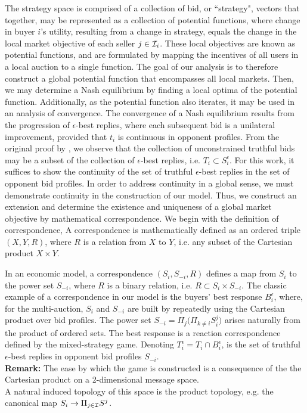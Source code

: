 The strategy space is comprised of a collection of bid, or ``strategy", vectors that
together, may be represented as a collection of potential functions, where change in buyer $i$'s
utility, resulting from a change in strategy, equals the change in
the local market objective of each seller $j\in\mathcal{I}_i$. These local objectives are known as potential functions, and are formulated by mapping the incentives of all users in a local auction to a single function. The goal of our analysis is to therefore construct a global potential function that encompasses all local markets. Then, we may determine a Nash equilibrium by finding a local optima of the potential function. Additionally, as the potential function also iterates, it may be used in an analysis of convergence. The
convergence of a Nash equilibrium results from the progression of
$\epsilon$-best replies, where each subsequent bid is a unilateral
improvement, provided that $t_i$ is continuous in opponent profiles.
From the original proof by \cite{lazar}, we observe that the collection of
unconstrained truthful bids may be a subset of the collection of $\epsilon$-best replies, i.e. $T_i\subset S_i^\epsilon$.         
For this work, it suffices to show the continuity of the set of truthful
$\epsilon$-best replies in the set of opponent bid profiles.
In order to address continuity in a global sense, we must demonstrate
continuity in the construction of our model.
Thus, we construct an extension %
and determine the existence and uniqueness of a global market objective by mathematical correspondence. We begin with the definition of correspondence,
{
A correspondence is mathematically defined as an ordered triple $(X,Y,R)$, where $R$ is a relation from $X$ to
$Y$, i.e. any subset of the Cartesian product $X\times Y$.
}

In an economic model, a correspondence $(S_i,S_{-i},R)$ defines a map from $S_i$
to the power set $S_{-i}$, where $R$ is a binary relation, i.e. $R \subset
S_i\times S_{-i}$. The classic
example of a correspondence in our model is the buyers' best response
$B_i^\epsilon$, where, for the multi-auction,
$S_i$ and $S_{-i}$ are built by repeatedly using the
Cartesian product over bid profiles. The power set 
$S_{-i} =\Pi_j \big(\Pi_{k\ne i} S_i^j)$ arises naturally from the
product of ordered sets. 
The best response is a reaction correspondence
defined by the mixed-strategy game. Denoting  $T_i^\epsilon = T_i\cap
B_i^\epsilon$, is the set of truthful $\epsilon$-best replies in opponent bid
profiles $S_{-i}$. \\
\textbf{Remark:} 
The ease by which the game is constructed is a consequence of the the Cartesian
product on a 2-dimensional message space. \\
A natural induced topology of this space is the product
topology, e.g. the canonical map $S_i \rightarrow \Pi_{j\in\mathcal{I}} S^j$.

